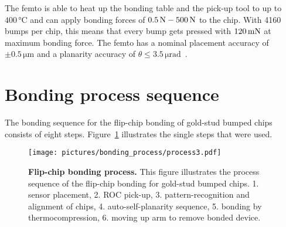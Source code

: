 The femto is able to heat up the bonding table and the pick-up tool to up to $400\,\si{\degreeCelsius}$ and can apply bonding forces of $0.5\,\rm{N}-500\,\rm{N}$ to the chip. With 4160 bumps per chip, this means that every bump gets pressed with $120\,\rm{mN}$ at maximum bonding force. The femto has a nominal placement accuracy of $\pm 0.5\,\si{\micro \meter}$ and a planarity accuracy of $\theta \leq 3.5\,\si{\micro \radian}$~\cite{Fin14b}.


\section{Bonding process sequence}
The bonding sequence for the flip-chip bonding of gold-stud bumped chips consists of eight steps. Figure~\ref{fig:bonding_process} illustrates the single steps that were used.
\begin{figure}
\begin{center}
\texttt{[image: pictures/bonding\_process/process3.pdf]}
\end{center}
\caption[Flip-chip bonding process]{\textbf{Flip-chip bonding process.} This figure illustrates the process sequence of the flip-chip bonding for gold-stud bumped chips. 1. sensor placement, 2. \ac{ROC} pick-up, 3. pattern-recognition and alignment of chips, 4. auto-self-planarity sequence, 5. bonding by thermocompression, 6. moving up arm to remove bonded device. }\label{fig:bonding_process}
\end{figure}

